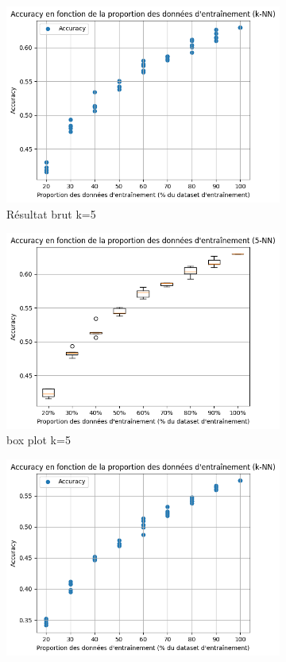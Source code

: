 \documentclass[12pt]{article}
\begin{document}
\begin{figure}[H]
\begin{subfigure}[t]{0.35\textwidth}
        \centering
        \includegraphics[width=\textwidth]{static/knn_goo_5_raw.png}
        \caption{Résultat brut k=5}
    \end{subfigure}
    \hfill
    \begin{subfigure}[t]{0.35\textwidth}
        \centering
        \includegraphics[width=\textwidth]{static/knn_goo_5.png}
        \caption{box plot k=5}
    \end{subfigure}
    \hfill
    \begin{subfigure}[t]{0.35\textwidth}
        \centering
        \includegraphics[width=\textwidth]{static/knn_goo_10_raw.png}

\end{subfigure}
\end{figure}
\end{document}
